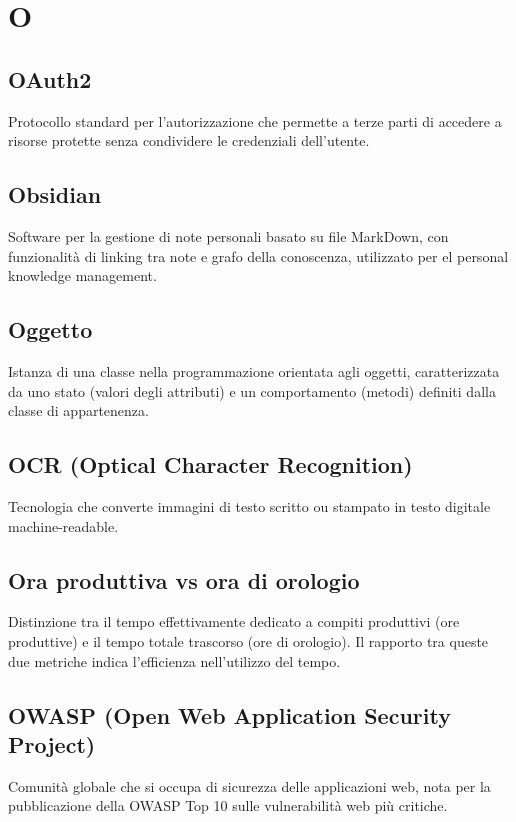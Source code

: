 \documentclass[a4paper,11pt]{article}
\begin{document}
\newpage
\section{O}

\subsection{OAuth2}
Protocollo standard per l'autorizzazione che permette a terze parti di accedere a risorse protette senza condividere le credenziali dell'utente.

\subsection{Obsidian}
Software per la gestione di note personali basato su file MarkDown, con funzionalità di linking tra note e grafo della conoscenza, utilizzato per el personal knowledge management.

\subsection{Oggetto}
Istanza di una classe nella programmazione orientata agli oggetti, caratterizzata da uno stato (valori degli attributi) e un comportamento (metodi) definiti dalla classe di appartenenza.

\subsection{OCR (Optical Character Recognition)}
Tecnologia che converte immagini di testo scritto ou stampato in testo digitale machine-readable.

\subsection{Ora produttiva vs ora di orologio}
Distinzione tra il tempo effettivamente dedicato a compiti produttivi (ore produttive) e il tempo totale trascorso (ore di orologio). Il rapporto tra queste due metriche indica l'efficienza nell'utilizzo del tempo.

\subsection{OWASP (Open Web Application Security Project)}
Comunità globale che si occupa di sicurezza delle applicazioni web, nota per la pubblicazione della OWASP Top 10 sulle vulnerabilità web più critiche.
\end{document}

